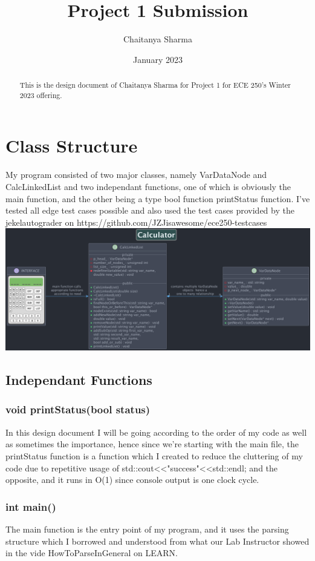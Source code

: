 \documentclass[a4paper]{article}
\title{Project 1 Submission}
\author{Chaitanya Sharma}
\date{January 2023}
\begin{document}
\begin{abstract}
    This is the design document of Chaitanya Sharma 
    for Project 1 for ECE 250's Winter 2023 offering.
\end{abstract}
\section{Class Structure}
    My program consisted of two major classes, namely {\color{draculapurple}VarDataNode} and 
    {\color{draculapurple}CalcLinkedList} and two independant functions, 
    one of which is obviously the {\color{draculapurple}main} function, and the other being a type 
    bool function {\color{draculapurple}printStatus} function. I've tested all edge test cases possible and also used the test cases provided by the jekelautograder on https://github.com/JZJisawesome/ece250-testcases
    \newline
    \includegraphics[scale=0.18, center]{Calculator.png}
    \subsection{\color{lightgray}Independant Functions}
    \subsubsection{{\color{orange}void} {\color{draculapurple}printStatus}({\color{orange}bool} {\color{yellow} status})}
    In this design document I will be going according to the order of my 
    code as well as sometimes the importance, hence since we're starting with the main file, the printStatus 
    function is a function which I created to reduce the cluttering of my 
    code due to repetitive usage of std::cout<<"success"<<std::endl; 
    and the opposite, and it runs in {\color{lightblue}O(1)} 
    since console output is one clock cycle.
    \subsubsection{{\color{orange} int} \color{draculapurple}main()}
    The main function is the entry point of my program, and it uses the 
    parsing structure which I borrowed and understood from what our Lab Instructor showed 
    in the vide HowToParseInGeneral on LEARN.
\end{document}

